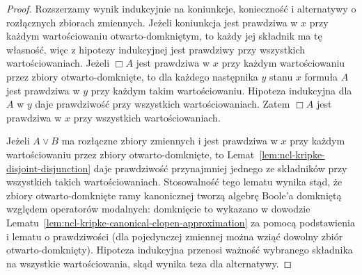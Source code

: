 \begin{proof}
Rozszerzamy wynik indukcyjnie na koniunkcje,
konieczność i alternatywy o rozłącznych
zbiorach zmiennych. Jeżeli koniunkcja jest
prawdziwa w $x$ przy każdym wartościowaniu
otwarto-domkniętym, to każdy jej składnik
ma tę własność, więc z hipotezy indukcyjnej
jest prawdziwy przy wszystkich wartościowaniach.
Jeżeli $\Box A$ jest prawdziwa w $x$
przy każdym wartościowaniu przez zbiory otwarto-domknięte,
to dla każdego następnika $y$ stanu $x$
formuła $A$ jest prawdziwa w $y$ przy każdym
takim wartościowaniu. Hipoteza indukcyjna
dla $A$ w $y$ daje prawdziwość przy
wszystkich wartościowaniach.
Zatem $\Box A$ jest prawdziwa w $x$
przy wszystkich wartościowaniach.

Jeżeli $A\vee B$ ma rozłączne zbiory
zmiennych i jest prawdziwa w $x$ przy każdym
wartościowaniu przez zbiory otwarto-domknięte, to
Lemat~\ref{lem:ncl-kripke-disjoint-disjunction}
daje prawdziwość przynajmniej jednego
ze składników przy wszystkich takich
wartościowaniach. Stosowalność tego lematu
wynika stąd, że zbiory otwarto-domknięte
ramy kanonicznej tworzą algebrę Boole'a
domkniętą względem operatorów modalnych:
domknięcie to wykazano w dowodzie
Lematu~\ref{lem:ncl-kripke-canonical-clopen-approximation}
za pomocą podstawienia i lematu o prawdziwości
(dla pojedynczej zmiennej można wziąć dowolny
zbiór otwarto-domknięty).
Hipoteza indukcyjna przenosi ważność
wybranego składnika na wszystkie
wartościowania, skąd wynika teza
dla alternatywy.
\end{proof}

